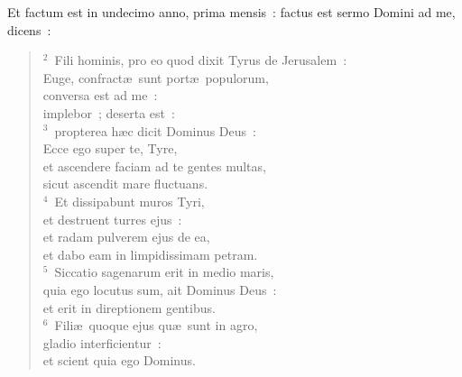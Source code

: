 \bchapter
\lettrine[lines=3,image=true,loversize=0.05,lraise=-0.03]{E}{}t factum est in undecimo anno, prima mensis~: factus est sermo Domini ad me, dicens~:
\begin{flushleft}\begin{verse}\vspace{6pt}${}^{2}$~Fili hominis, pro eo quod dixit Tyrus de Jerusalem~:\\ Euge, confract\ae\ sunt port\ae\ populorum,\\ conversa est ad me~:\\ implebor~; deserta est~:\\
${}^{3}$~propterea h\ae c dicit Dominus Deus~:\\ Ecce ego super te, Tyre,\\ et ascendere faciam ad te gentes multas,\\ sicut ascendit mare fluctuans.\\
${}^{4}$~Et dissipabunt muros Tyri,\\ et destruent turres ejus~:\\ et radam pulverem ejus de ea,\\ et dabo eam in limpidissimam petram.\\
${}^{5}$~Siccatio sagenarum erit in medio maris,\\ quia ego locutus sum, ait Dominus Deus~:\\ et erit in direptionem gentibus.\\
${}^{6}$~Fili\ae\ quoque ejus qu\ae\ sunt in agro,\\ gladio interficientur~:\\ et scient quia ego Dominus.\end{verse}\end{flushleft}


